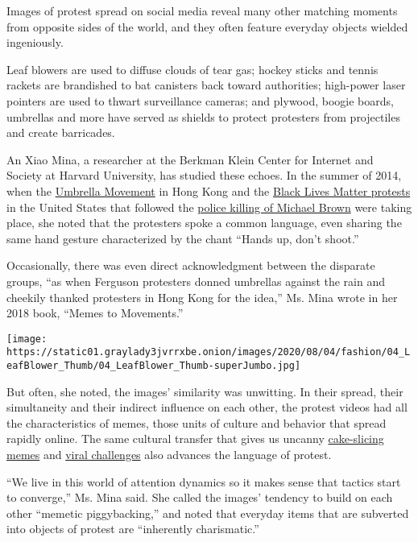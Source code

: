 Images of protest spread on social media reveal many other matching
moments from opposite sides of the world, and they often feature
everyday objects wielded ingeniously.

Leaf blowers are used to diffuse clouds of tear gas; hockey sticks and
tennis rackets are brandished to bat canisters back toward authorities;
high-power laser pointers are used to thwart surveillance cameras; and
plywood, boogie boards, umbrellas and more have served as shields to
protect protesters from projectiles and create barricades.

An Xiao Mina, a researcher at the Berkman Klein Center for Internet and
Society at Harvard University, has studied these echoes. In the summer
of 2014, when the
\href{https://www.nytimes3xbfgragh.onion/2019/08/30/world/asia/hong-kong-protests.html}{Umbrella
Movement} in Hong Kong and the
\href{https://www.nytimes3xbfgragh.onion/2016/08/23/us/how-blacklivesmatter-came-to-define-a-movement.html}{Black
Lives Matter protests} in the United States that followed the
\href{https://www.nytimes3xbfgragh.onion/interactive/2014/08/13/us/ferguson-missouri-town-under-siege-after-police-shooting.html}{police
killing of Michael Brown} were taking place, she noted that the
protesters spoke a common language, even sharing the same hand gesture
characterized by the chant ``Hands up, don't shoot.''

Occasionally, there was even direct acknowledgment between the disparate
groups, ``as when Ferguson protesters donned umbrellas against the rain
and cheekily thanked protesters in Hong Kong for the idea,'' Ms. Mina
wrote in her 2018 book, ``Memes to Movements.''

\texttt{[image: https://static01.graylady3jvrrxbe.onion/images/2020/08/04/fashion/04\_LeafBlower\_Thumb/04\_LeafBlower\_Thumb-superJumbo.jpg]}

But often, she noted, the images' similarity was unwitting. In their
spread, their simultaneity and their indirect influence on each other,
the protest videos had all the characteristics of memes, those units of
culture and behavior that spread rapidly online. The same cultural
transfer that gives us uncanny
\href{https://www.nytimes3xbfgragh.onion/2020/07/14/style/what-is-the-cake-meme.html}{cake-slicing
memes} and
\href{https://www.nytimes3xbfgragh.onion/2018/08/23/style/shiggy-challenges-inmyfeelings.html}{viral
challenges} also advances the language of protest.

``We live in this world of attention dynamics so it makes sense that
tactics start to converge,'' Ms. Mina said. She called the images'
tendency to build on each other ``memetic piggybacking,'' and noted that
everyday items that are subverted into objects of protest are
``inherently charismatic.''

